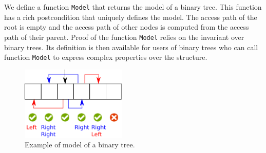 \documentclass{llncs}
\newcommand{\spark}{SPARK\xspace}
\begin{document}
We define a function \texttt{Model} that
returns the model of a binary tree. This function has a rich postcondition that
uniquely defines the model. The access path of the root is empty and the access path of other nodes is
computed from the access path of their parent. Proof of the function \texttt{Model}
relies on the invariant over binary trees. Its definition
is then available for users of binary trees who can call function
\texttt{Model} to express complex properties over the structure.






\begin{figure}[ht]
\begin{center}
\includegraphics[width=5cm]{model.pdf}
\caption{\label{fig-binary-mod-ex} Example of model of a binary tree.}
\end{center}
\end{figure}
\end{document}

